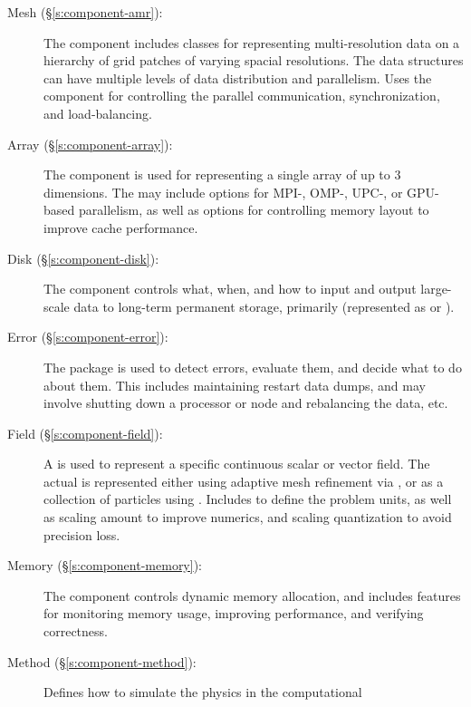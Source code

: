 \begin{description}
%
 \item [\todo Mesh (\S\ref{s:component-amr}): ]
%
        The  component includes classes for representing
        multi-resolution data on a hierarchy of grid patches of
        varying spacial resolutions.  The  data
        structures can have multiple levels of data distribution and
        parallelism.  Uses the  component for
        controlling the parallel communication, synchronization, and
        load-balancing.
%
 \item [\todo Array (\S\ref{s:component-array}): ]
%
        The  component is used for representing a single
        array of up to $3$ dimensions.  The  may include
        options for MPI-, OMP-, UPC-, or GPU-based parallelism, as
        well as options for controlling memory layout to improve cache
        performance.
%
 \item [\todo Disk (\S\ref{s:component-disk}): ]
%
        The  component controls what, when, and how to
        input and output large-scale data to long-term permanent
        storage, primarily  (represented as
         or ).
%
 \item [\todo Error (\S\ref{s:component-error}): ]
%
        The  package is used to detect errors, evaluate
        them, and decide what to do about them.  This includes
        maintaining restart data dumps, and may involve shutting down
        a processor or node and rebalancing the data, etc.
%
 \item [\todo Field (\S\ref{s:component-field}): ]
%
        A  is used to represent a specific continuous
        scalar or vector field.  The actual  is
        represented either using adaptive mesh refinement via
        , or as a collection of particles using
        .  Includes  to define the problem
        units, as well as scaling amount to improve numerics, and
        scaling quantization to avoid precision loss.
%
 \item [\todo Memory (\S\ref{s:component-memory}): ]
%
        The  component controls dynamic memory
        allocation, and includes features for monitoring memory usage,
        improving performance, and verifying correctness.
%
 \item [\todo Method (\S\ref{s:component-method}): ]
%
        Defines how to simulate the physics in the computational

\end{description}
